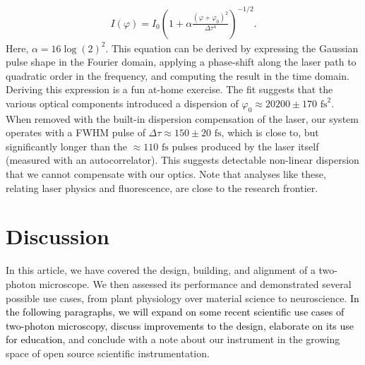 \documentclass[10pt,letterpaper]{article}
\begin{document}
\begin{eqnarray}
    I(\varphi) =I_0 \left(1+\alpha\frac{(\varphi+\varphi_0)^2}{\Delta\tau^4}\right)^{-1/2}.
\end{eqnarray}
Here, $\alpha=16\log(2)^2$. This equation can be derived by expressing the Gaussian pulse shape in the Fourier domain, applying a phase-shift along the laser path to quadratic order in the frequency, and computing the result in the time domain. Deriving this expression is a fun at-home exercise. The fit suggests that the various optical components introduced a dispersion of $\varphi_0\approx20200\pm170\text{ fs}^2$. When removed with the built-in dispersion compensation of the laser, our system operates with a FWHM pulse of $\Delta\tau \approx 150\pm20\text{ fs}$, which is close to, but significantly longer than the $\approx110\text{ fs}$ pulses produced by the laser itself (measured with an autocorrelator). This suggests detectable non-linear dispersion that we cannot compensate with our optics. Note that analyses like these, relating laser physics and fluorescence, are close to the research frontier\cite{Piazza2016,Saidi2023}.

\section*{Discussion}

In this article, we have covered the design, building, and alignment of a two-photon microscope. We then assessed its performance and demonstrated several possible use cases, from plant physiology over material science to neuroscience. \textcolor{black}{In the following paragraphs, we will expand on some recent scientific use cases of two-photon microscopy, discuss improvements to the design, elaborate on its use for education,} and conclude with a note about our instrument in the growing space of open source scientific instrumentation.
\end{document}
